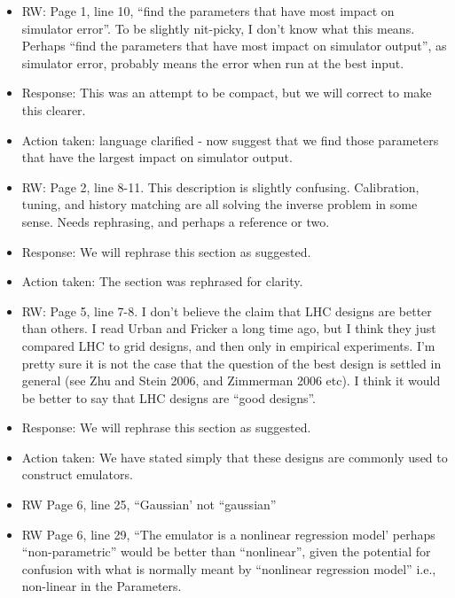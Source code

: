 \documentclass[esd, manuscript]{copernicus}
\begin{document}
\begin{itemize}

\item{RW: Page 1, line 10, ``find the parameters that have most impact on simulator error''. To be slightly nit-picky, I don't know what this means. Perhaps ``find the parameters that have most impact on simulator output'', as simulator error, probably means the error when run at the best input.}

\item{Response: This was an attempt to be compact, but we will correct to make this clearer.}

\item{Action taken: language clarified - now suggest that we find those parameters that have the largest impact on simulator output.}

\item{RW: Page 2, line 8-11. This description is slightly confusing. Calibration, tuning, and history matching are all solving the inverse problem in some sense. Needs rephrasing, and perhaps a reference or two.}

\item{Response: We will rephrase this section as suggested.}

\item{Action taken: The section was rephrased for clarity.}

\item{RW: Page 5, line 7-8. I don't believe the claim that LHC designs are better than others. I read Urban and Fricker a long time ago, but I think they just compared LHC to grid designs, and then only in empirical experiments. I'm pretty sure it is not the case that the question of the best design is settled in general (see Zhu and Stein 2006, and Zimmerman 2006 etc). I think it would be better to say that LHC designs are ``good designs''.}
 
\item{Response: We will rephrase this section as suggested.}

\item{Action taken: We have stated simply that these designs are commonly used to construct emulators. }
\item{RW Page 6, line 25, ``Gaussian' not ``gaussian''}
\item{RW Page 6, line 29, ``The emulator is a nonlinear regression model' perhaps ``non-parametric'' would be better than ``nonlinear'', given the potential for confusion with what is normally meant by ``nonlinear regression model'' i.e., non-linear in the Parameters.

}
\end{itemize}
\end{document}
